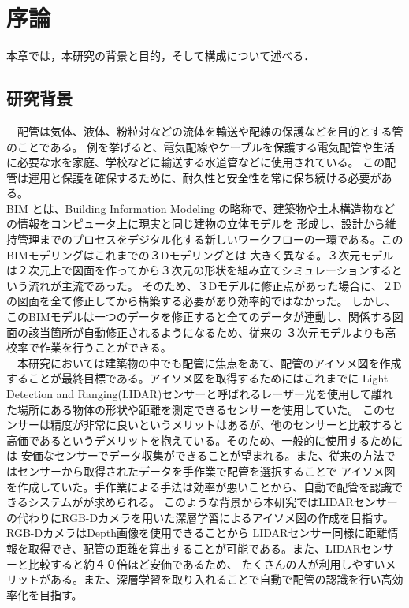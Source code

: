 \chapter{%
序論}

本章では，本研究の背景と目的，そして構成について述べる．


\section{研究背景}
　配管は気体、液体、粉粒対などの流体を輸送や配線の保護などを目的とする管のことである。
例を挙げると、電気配線やケーブルを保護する電気配管や生活に必要な水を家庭、学校などに輸送する水道管などに使用されている。
この配管は運用と保護を確保するために、耐久性と安全性を常に保ち続ける必要がある。 \\
BIM とは、Building Information Modeling の略称で、建築物や土木構造物などの情報をコンピュータ上に現実と同じ建物の立体モデルを
形成し、設計から維持管理までのプロセスをデジタル化する新しいワークフローの一環である。このBIMモデリングはこれまでの３Dモデリングとは
大きく異なる。３次元モデルは２次元上で図面を作ってから３次元の形状を組み立てシミュレーションするという流れが主流であった。
そのため、３Dモデルに修正点があった場合に、２Dの図面を全て修正してから構築する必要があり効率的ではなかった。
しかし、このBIMモデルは一つのデータを修正すると全てのデータが連動し、関係する図面の該当箇所が自動修正されるようになるため、従来の
３次元モデルよりも高校率で作業を行うことができる。\\
　本研究においては建築物の中でも配管に焦点をあて、配管のアイソメ図を作成することが最終目標である。アイソメ図を取得するためにはこれまでに
Light Detection and Ranging(LIDAR)センサーと呼ばれるレーザー光を使用して離れた場所にある物体の形状や距離を測定できるセンサーを使用していた。
このセンサーは精度が非常に良いというメリットはあるが、他のセンサーと比較すると高価であるというデメリットを抱えている。そのため、一般的に使用するためには
安価なセンサーでデータ収集ができることが望まれる。また、従来の方法ではセンサーから取得されたデータを手作業で配管を選択することで
アイソメ図を作成していた。手作業による手法は効率が悪いことから、自動で配管を認識できるシステムがが求められる。
このような背景から本研究ではLIDARセンサーの代わりにRGB-Dカメラを用いた深層学習によるアイソメ図の作成を目指す。RGB-DカメラはDepth画像を使用できることから
LIDARセンサー同様に距離情報を取得でき、配管の距離を算出することが可能である。また、LIDARセンサーと比較すると約４０倍ほど安価であるため、
たくさんの人が利用しやすいメリットがある。また、深層学習を取り入れることで自動で配管の認識を行い高効率化を目指す。


